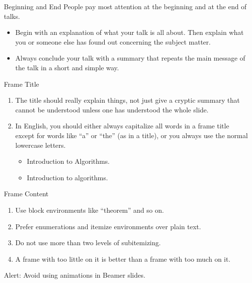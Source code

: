 \documentclass[compress,aspectratio=169]{beamer}
\begin{document}
\begin{frame}{Beginning and End}
    People pay most attention at the beginning and at the end of talks.

    \medskip
    \begin{itemize}\setlength{\itemsep}{1em}
        \item Begin with an explanation of what your talk is all about. Then explain what you or someone else has found out concerning the subject matter.

        \item Always conclude your talk with a summary that repeats the main message of the talk in a short and simple way.
    \end{itemize}

\end{frame}

\begin{frame}{Frame Title}
    \begin{enumerate}\setlength{\itemsep}{1em}
        \item The title should really explain things, not just give a cryptic summary that cannot be understood unless one has understood the whole slide.

        \item In English, you should either always capitalize all words in a frame title except for words like ``a'' or ``the'' (as in a title), or you always use the normal lowercase letters.
              \begin{itemize}
                  \item Introduction to Algorithms.
                  \item Introduction to algorithms.
              \end{itemize}
    \end{enumerate}
\end{frame}

\begin{frame}{Frame Content}
    \begin{enumerate}\setlength{\itemsep}{1em}
        \item Use block environments like ``theorem'' and so on.

        \item Prefer enumerations and itemize environments over plain text.

        \item Do not use more than two levels of subitemizing.

        \item A frame with too little on it is better than a frame with too much on it.
    \end{enumerate}

    \bigskip
    Alert: \alert{Avoid using animations in Beamer slides.}
\end{frame}
\end{document}
